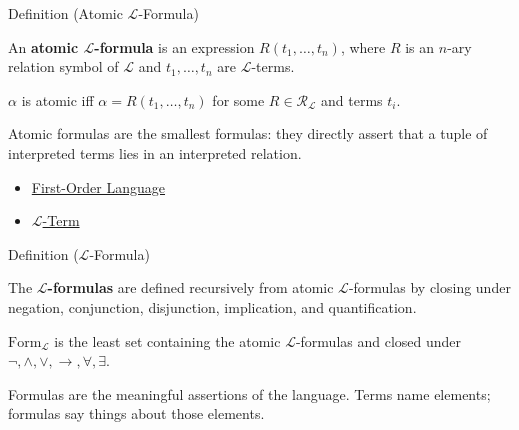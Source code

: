 
\begin{definitionbox}{Definition (Atomic $\mathcal{L}$-Formula)}
\begin{definition}\label{def:l-atomic-formula}
An \textbf{atomic $\mathcal{L}$-formula} is an expression
$R(t_1,\ldots,t_n)$, where $R$ is an $n$-ary relation symbol of
$\mathcal{L}$ and $t_1,\ldots,t_n$ are $\mathcal{L}$-terms.
\end{definition}
\end{definitionbox}

\begin{remark*}
$\alpha$ is atomic iff $\alpha=R(t_1,\ldots,t_n)$ for some
$R\in\mathcal{R}_{\mathcal{L}}$ and terms $t_i$.
\end{remark*}

\begin{remark*}[Interpretation]
Atomic formulas are the smallest formulas: they directly assert that a tuple
of interpreted terms lies in an interpreted relation.
\end{remark*}

\begin{dependencies}
\begin{itemize}
  \item \hyperref[def:first-order-language]{First-Order Language}
  \item \hyperref[def:l-term]{$\mathcal{L}$-Term}
\end{itemize}
\end{dependencies}

\begin{definitionbox}{Definition ($\mathcal{L}$-Formula)}
\begin{definition}\label{def:l-formula}
The \textbf{$\mathcal{L}$-formulas} are defined recursively from atomic
$\mathcal{L}$-formulas by closing under negation, conjunction, disjunction,
implication, and quantification.
\end{definition}
\end{definitionbox}

\begin{remark*}
$\mathrm{Form}_{\mathcal{L}}$ is the least set containing the atomic
$\mathcal{L}$-formulas and closed under
$\lnot,\land,\lor,\to,\forall,\exists$.
\end{remark*}

\begin{remark*}[Interpretation]
Formulas are the meaningful assertions of the language. Terms name elements;
formulas say things about those elements.
\end{remark*}

